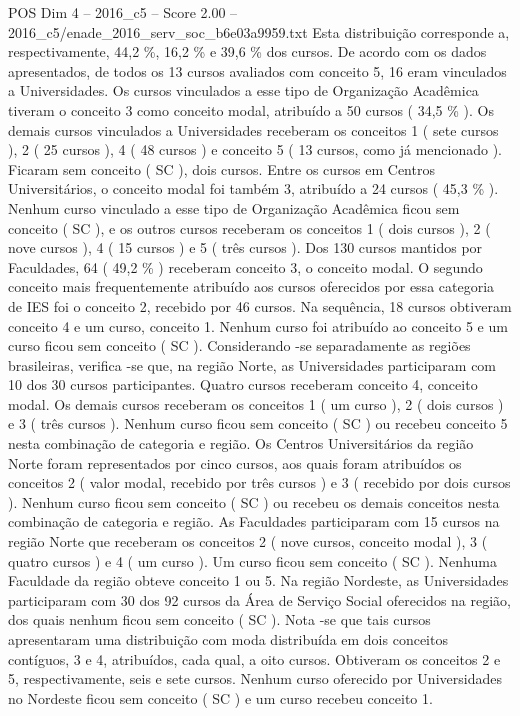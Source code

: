 \begin{textsample}{POS Dim 4 – 2016\_c5 – Score 2.00 – 2016\_c5/enade\_2016\_serv\_soc\_b6e03a9959.txt}
Esta distribuição corresponde a, respectivamente, 44,2 \%, 16,2 \% e 39,6 \% dos cursos.
De acordo com os dados apresentados, de todos os 13 cursos avaliados com conceito 5, 16 eram vinculados a Universidades.
Os cursos vinculados a esse tipo de Organização Acadêmica tiveram o conceito 3 como conceito modal, atribuído a 50 cursos ( 34,5 \% ).
Os demais cursos vinculados a Universidades receberam os conceitos 1 ( sete cursos ), 2 ( 25 cursos ), 4 ( 48 cursos ) e conceito 5 ( 13 cursos, como já mencionado ).
Ficaram sem conceito ( SC ), dois cursos.
Entre os cursos em Centros Universitários, o conceito modal foi também 3, atribuído a 24 cursos ( 45,3 \% ).
Nenhum curso vinculado a esse tipo de Organização Acadêmica ficou sem conceito ( SC ), e os outros cursos receberam os conceitos 1 ( dois cursos ), 2 ( nove cursos ), 4 ( 15 cursos ) e 5 ( três cursos ).
Dos 130 cursos mantidos por Faculdades, 64 ( 49,2 \% ) receberam conceito 3, o conceito modal.
O segundo conceito mais frequentemente atribuído aos cursos oferecidos por essa categoria de IES foi o conceito 2, recebido por 46 cursos.
Na sequência, 18 cursos obtiveram conceito 4 e um curso, conceito 1.
Nenhum curso foi atribuído ao conceito 5 e um curso ficou sem conceito ( SC ).
Considerando -se separadamente as regiões brasileiras, verifica -se que, na região Norte, as Universidades participaram com 10 dos 30 cursos participantes.
Quatro cursos receberam conceito 4, conceito modal.
Os demais cursos receberam os conceitos 1 ( um curso ), 2 ( dois cursos ) e 3 ( três cursos ).
Nenhum curso ficou sem conceito ( SC ) ou recebeu conceito 5 nesta combinação de categoria e região.
Os Centros Universitários da região Norte foram representados por cinco cursos, aos quais foram atribuídos os conceitos 2 ( valor modal, recebido por três cursos ) e 3 ( recebido por dois cursos ).
Nenhum curso ficou sem conceito ( SC ) ou recebeu os demais conceitos nesta combinação de categoria e região.
As Faculdades participaram com 15 cursos na região Norte que receberam os conceitos 2 ( nove cursos, conceito modal ), 3 ( quatro cursos ) e 4 ( um curso ).
Um curso ficou sem conceito ( SC ).
Nenhuma Faculdade da região obteve conceito 1 ou 5.
Na região Nordeste, as Universidades participaram com 30 dos 92 cursos da Área de Serviço Social oferecidos na região, dos quais nenhum ficou sem conceito ( SC ).
Nota -se que tais cursos apresentaram uma distribuição com moda distribuída em dois conceitos contíguos, 3 e 4, atribuídos, cada qual, a oito cursos.
Obtiveram os conceitos 2 e 5, respectivamente, seis e sete cursos.
Nenhum curso oferecido por Universidades no Nordeste ficou sem conceito ( SC ) e um curso recebeu conceito 1.

\end{textsample}
